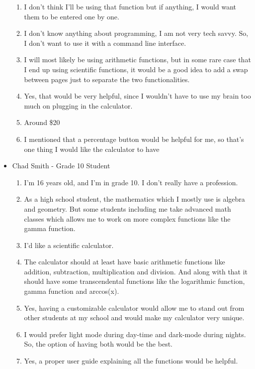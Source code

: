 \begin{itemize}
\begin{enumerate}
                        \item I don’t think I’ll be using that function but if anything, I would want them to be entered one by one.
                        \item I don’t know anything about programming, I am not very tech savvy. So, I don’t want to use it with a command line interface.
                        \item I will most likely be using arithmetic functions, but in some rare case that I end up using scientific functions, it would be a good idea to add a swap between pages just to separate the two functionalities.
                        \item Yes, that would be very helpful, since I wouldn’t have to use my brain too much on plugging in the calculator.
                        \item Around \$20
                        \item I mentioned that a percentage button would be helpful for me, so that’s one thing I would like the calculator to have
                    \end{enumerate}
                \item Chad Smith - Grade 10 Student
                    \begin{enumerate}
                        \item I'm 16 years old, and I'm in grade 10. I don't really have a profession.
                        \item As a high school student, the mathematics which I mostly use is algebra and geometry. But some students including me take advanced math classes which allows me to work on more complex functions like the gamma function.
                        \item I’d like a scientific calculator.
                        \item The calculator should at least have basic arithmetic functions like addition, subtraction, multiplication and division. And along with that it should have some transcendental functions like the logarithmic function, gamma function and arccos(x).
                        \item Yes, having a customizable calculator would allow me to stand out from other students at my school and would make my calculator very unique.
                        \item I would prefer light mode during day-time and dark-mode during nights. So, the option of having both would be the best.
                        \item Yes, a proper user guide explaining all the functions would be helpful.

\end{enumerate}
\end{itemize}

